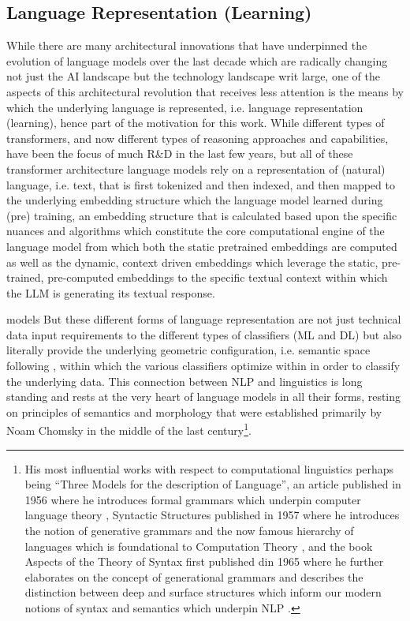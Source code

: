 \documentclass[final]{clv2025}
\begin{document}
\subsection{Language Representation (Learning)}
While there are many architectural innovations that have underpinned the evolution of language models over the last decade which are radically changing not just the AI landscape but the technology landscape writ large, one of the aspects of this architectural revolution that receives less attention is the means by which the underlying language is represented, i.e. language representation (learning), hence part of the motivation for this work. While different types of transformers, and now different types of reasoning approaches and capabilities, have been the focus of much R\&D in the last few years, but all of these transformer architecture language models rely on a representation of (natural) language, i.e. text, that is first tokenized and then indexed, and then mapped to the underlying embedding structure which the language model learned during (pre) training, an embedding structure that is calculated based upon the specific nuances and algorithms which constitute the core computational engine of the language model from which both the static pretrained embeddings are computed as well as the dynamic, context driven embeddings which leverage the static, pre-trained, pre-computed embeddings to the specific textual context within which the LLM is generating its textual response. 


models But these different forms of language representation are not just technical data input requirements to the different types of classifiers (ML and DL) but also literally provide the underlying geometric configuration, i.e. semantic space following \cite{worth}, within which the various classifiers optimize within in order to classify the underlying data. This connection between NLP and linguistics is long standing and rests at the very heart of language models in all their forms, resting on principles of semantics and morphology that were established primarily by Noam Chomsky in the middle of the last century\footnote{  His most influential works with respect to computational linguistics perhaps being “Three Models for the description of Language”, an article published in 1956 where he introduces formal grammars which underpin computer language theory \cite{chomsky56}, Syntactic Structures published in 1957 where he introduces the notion of generative grammars and the now famous hierarchy of languages which is foundational to Computation Theory \cite{Chomsky57}, and the book Aspects of the Theory of Syntax first published din 1965 where he further elaborates on the concept of generational grammars and describes the distinction between deep and surface structures which inform our modern notions of syntax and semantics which underpin NLP \cite{chomsky65aspects}.}. 
\end{document}
